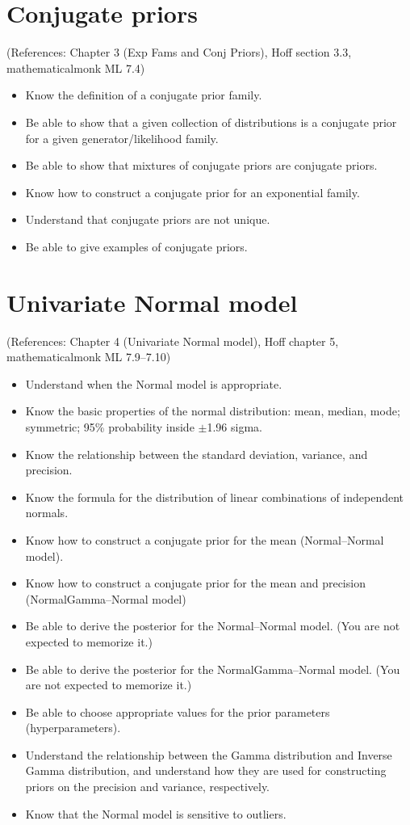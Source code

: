 \documentclass[12pt]{article}
\begin{document}
\section{Conjugate priors}
(References: Chapter 3 (Exp Fams and Conj Priors), Hoff section 3.3, mathematicalmonk ML 7.4)
\begin{itemize}
\setlength\itemsep{0em}
\item Know the definition of a conjugate prior family.
\item Be able to show that a given collection of distributions is a conjugate prior for a given generator/likelihood family.
\item Be able to show that mixtures of conjugate priors are conjugate priors.
\item Know how to construct a conjugate prior for an exponential family.
\item Understand that conjugate priors are not unique.
\item Be able to give examples of conjugate priors.
\end{itemize}



\section{Univariate Normal model}
(References: Chapter 4 (Univariate Normal model), Hoff chapter 5, mathematicalmonk ML 7.9--7.10)
\begin{itemize}
\setlength\itemsep{0em}
\item Understand when the Normal model is appropriate.
\item Know the basic properties of the normal distribution: mean, median, mode; symmetric; 95\% probability inside $\pm$1.96 sigma.
\item Know the relationship between the standard deviation, variance, and precision.
\item Know the formula for the distribution of linear combinations of independent normals.
\item Know how to construct a conjugate prior for the mean (Normal--Normal model).
\item Know how to construct a conjugate prior for the mean and precision (NormalGamma--Normal model)
\item Be able to derive the posterior for the Normal--Normal model. (You are not expected to memorize it.)
\item Be able to derive the posterior for the NormalGamma--Normal model. (You are not expected to memorize it.)
\item Be able to choose appropriate values for the prior parameters (hyperparameters).
\item Understand the relationship between the Gamma distribution and Inverse Gamma distribution, and understand how they are used for constructing priors on the precision and variance, respectively.
\item Know that the Normal model is sensitive to outliers.
\end{itemize}
\end{document}

